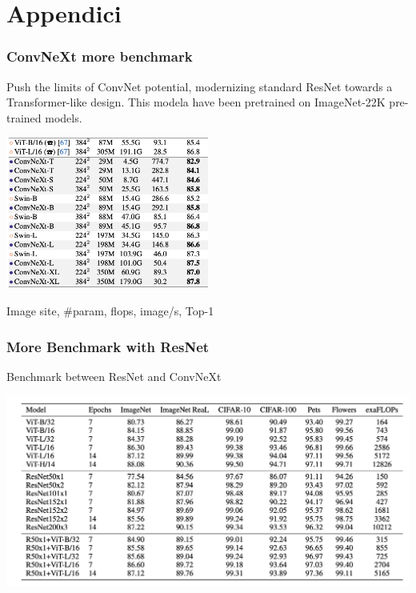 \section{Appendici}

\begin{frame}
\frametitle{ConvNeXt more benchmark}
Push the limits of ConvNet potential, modernizing  standard ResNet towards a Transformer-like design.
This modela have been pretrained on ImageNet-22K pre-trained models.

\begin{center}
    \includegraphics[width=0.5\textwidth]{img/4-section/ConvNext2.png}
\end{center}

Image site, \#param, flops, image/s, Top-1

\end{frame}


\begin{frame}
\frametitle{More Benchmark with ResNet}
Benchmark between ResNet and ConvNeXt
\begin{center}
    \includegraphics[width=1\textwidth]{img/4-section/More-benchmark.png}
\end{center}

\end{frame}

